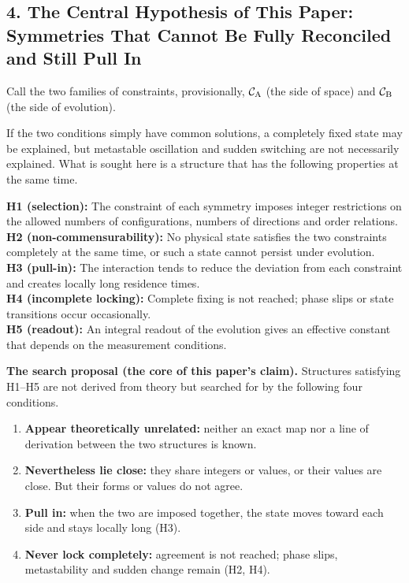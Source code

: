 \documentclass[
  a4paper,
]{article}
\providecommand{\tightlist}{%
  \setlength{\itemsep}{0pt}\setlength{\parskip}{0pt}}
\begin{document}
\subsection{4. The Central Hypothesis of This Paper: Symmetries That
Cannot Be Fully Reconciled and Still Pull
In}\label{the-central-hypothesis-of-this-paper-symmetries-that-cannot-be-fully-reconciled-and-still-pull-in}

Call the two families of constraints, provisionally,
\(\mathcal C_{\rm A}\) (the side of space) and \(\mathcal C_{\rm B}\)
(the side of evolution).

If the two conditions simply have common solutions, a completely fixed
state may be explained, but metastable oscillation and sudden switching
are not necessarily explained. What is sought here is a structure that
has the following properties at the same time.

\textbf{H1 (selection):} The constraint of each symmetry imposes integer
restrictions on the allowed numbers of configurations, numbers of
directions and order relations.\\
\textbf{H2 (non-commensurability):} No physical state satisfies the two
constraints completely at the same time, or such a state cannot persist
under evolution.\\
\textbf{H3 (pull-in):} The interaction tends to reduce the deviation
from each constraint and creates locally long residence times.\\
\textbf{H4 (incomplete locking):} Complete fixing is not reached; phase
slips or state transitions occur occasionally.\\
\textbf{H5 (readout):} An integral readout of the evolution gives an
effective constant that depends on the measurement conditions.

\textbf{The search proposal (the core of this paper's claim).}
Structures satisfying H1--H5 are not derived from theory but searched
for by the following four conditions.

\begin{enumerate}
\def\labelenumi{\arabic{enumi}.}
\tightlist
\item
  \textbf{Appear theoretically unrelated:} neither an exact map nor a
  line of derivation between the two structures is known.
\item
  \textbf{Nevertheless lie close:} they share integers or values, or
  their values are close. But their forms or values do not agree.
\item
  \textbf{Pull in:} when the two are imposed together, the state moves
  toward each side and stays locally long (H3).
\item
  \textbf{Never lock completely:} agreement is not reached; phase slips,
  metastability and sudden change remain (H2, H4).
\end{enumerate}
\end{document}
